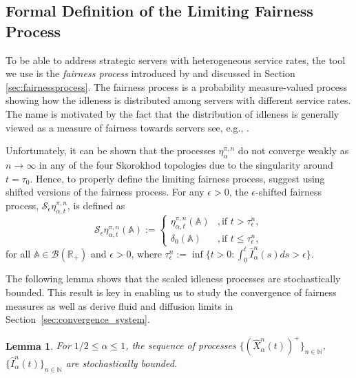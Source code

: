 \documentclass[a4paper,11pt,twoside]{article}
\numberwithin{equation}{section}
\numberwithin{figure}{section}
\theoremstyle{plain}
\newtheorem{lemma}[theorem]{Lemma}
\newcommand{\cB}{\mathcal{B}}
\newcommand{\cS}{\mathcal{S}}
\newcommand{\AAA}{\mathbb{A}}
\newcommand{\NN}{\mathbb{N}}
\newcommand{\RR}{\mathbb{R}}
\newcommand{\1}{\mathbbm{1}}
\newcommand{\toP}{\stackrel{p}{\rightarrow}}
\begin{document}
\subsection{Formal Definition of the Limiting Fairness Process}\label{app:fairness_definition}

To be able to address strategic servers with heterogeneous service rates, the tool we use is the \emph{fairness process} introduced by \cite{bukeqin2019} and discussed in Section \ref{sec:fairnessprocess}. 
The fairness process is a probability measure-valued process showing how the idleness is distributed among servers with different service rates. The name is motivated by the fact that the distribution of idleness is generally viewed as  a measure of fairness towards servers see, e.g., \cites{armward10, wararm13}.  

Unfortunately, it can be shown that the processes $\eta_{\alpha}^{\pi,n}$ do not converge weakly as $n\to \infty$ in any of the four Skorokhod topologies due to the singularity around $t=\tau_0$. 
Hence, to properly define the limiting fairness process, \cite{bukeqin2019} suggest using shifted versions of the fairness process. For any $\epsilon>0$,  the $\epsilon$-shifted fairness process, $\cS_\epsilon\eta_{\alpha,t}^{\pi,n}$, is defined as 
\begin{equation}
    \cS_\epsilon\eta_{\alpha,t}^{\pi,n}(\AAA):=\left\{\begin{array}{ll}
    \eta_{\alpha,t}^{\pi,n}(\AAA) &, \mbox{if }t>\tau_\epsilon^n,
    \\
    \delta_0(\AAA) &, \mbox{if }t\leq \tau_\epsilon^n, 
    \end{array}\right.
    \label{eq:shifted_fairness}
\end{equation}
 for all $\AAA \in \cB(\RR_+)$ and $\epsilon>0$, where $\tau_\epsilon^n :=\inf\{t>0:\int_0^t\hat{I}_\alpha^n(s)ds>\epsilon\}$. 
 
The following lemma shows that the scaled idleness processes are stochastically bounded. This result is key in enabling us to study the convergence of fairness measures as well as derive fluid and diffusion limits in Section~\ref{sec:convergence_system}.
\begin{lemma}
For $1/2\leq\alpha\leq 1$, the sequence of processes  $\{(\hat{X}_\alpha^n(t))^+\}_{n\in \NN}$, $\{\hat{I}_\alpha^n(t)\}_{n\in\NN}$ are stochastically bounded. %
\label{lem:pos_conv}
\end{lemma}
\end{document}
